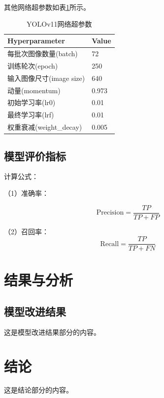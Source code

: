 其他网络超参数如表\ref{tab:table2-2}所示。
\begin{table}[h]
    \caption{YOLOv11网络超参数}\label{tab:table2-2}
    \vspace{0.5em}\centering\wuhao
    \begin{tabular}{ll}
    \toprule[1.5pt]
    Hyperparameter & Value \\
    \midrule[1pt]
    每批次图像数量(batch) & 72 \\
    训练轮次(epoch) & 250 \\
    输入图像尺寸(image size) & 640 \\
    动量(momentum) & 0.973 \\
    初始学习率(lr0) & 0.01 \\
    最终学习率(lrf) & 0.01 \\
    权重衰减(weight\_decay) & 0.005 \\
    \bottomrule[1.5pt]
    \end{tabular}
    \vspace{\baselineskip}
    \end{table}

\section{模型评价指标}
计算公式：

（1）准确率：

\begin{equation}
\label{eq:precision}
\mathrm{Precision} = \frac{TP}{TP + FP}
\end{equation}

（2）召回率：
\begin{equation}
\label{eq:recall}
\mathrm{Recall} = \frac{TP}{TP + FN}
\end{equation}


\chapter{结果与分析}
\section{模型改进结果}
这是模型改进结果部分的内容。


\chapter{结论}
这是结论部分的内容。

